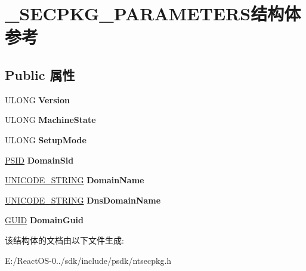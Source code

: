 \hypertarget{struct___s_e_c_p_k_g___p_a_r_a_m_e_t_e_r_s}{}\section{\+\_\+\+S\+E\+C\+P\+K\+G\+\_\+\+P\+A\+R\+A\+M\+E\+T\+E\+R\+S结构体 参考}
\label{struct___s_e_c_p_k_g___p_a_r_a_m_e_t_e_r_s}
\subsection*{Public 属性}
\begin{DoxyCompactItemize}
\item 
\mbox{\label{struct___s_e_c_p_k_g___p_a_r_a_m_e_t_e_r_s_a3725922c50c4a83540a82a3fb1a77fdd}} 
U\+L\+O\+NG {\bfseries Version}
\item 
\mbox{\label{struct___s_e_c_p_k_g___p_a_r_a_m_e_t_e_r_s_af290c1d3bbd445cbbc3fdabc88ea8e8d}} 
U\+L\+O\+NG {\bfseries Machine\+State}
\item 
\mbox{\label{struct___s_e_c_p_k_g___p_a_r_a_m_e_t_e_r_s_a6373e979362496698671b70def97b03e}} 
U\+L\+O\+NG {\bfseries Setup\+Mode}
\item 
\mbox{\label{struct___s_e_c_p_k_g___p_a_r_a_m_e_t_e_r_s_aefd0943249dc145f2f7fe12150eb024f}} 
\hyperlink{struct___s_i_d}{P\+S\+ID} {\bfseries Domain\+Sid}
\item 
\mbox{\label{struct___s_e_c_p_k_g___p_a_r_a_m_e_t_e_r_s_acf5c68787bb1ffeea4698a39dd4d249f}} 
\hyperlink{struct___u_n_i_c_o_d_e___s_t_r_i_n_g}{U\+N\+I\+C\+O\+D\+E\+\_\+\+S\+T\+R\+I\+NG} {\bfseries Domain\+Name}
\item 
\mbox{\label{struct___s_e_c_p_k_g___p_a_r_a_m_e_t_e_r_s_a92a741ec3e779c63be5a6dd6c1d5ea6b}} 
\hyperlink{struct___u_n_i_c_o_d_e___s_t_r_i_n_g}{U\+N\+I\+C\+O\+D\+E\+\_\+\+S\+T\+R\+I\+NG} {\bfseries Dns\+Domain\+Name}
\item 
\mbox{\label{struct___s_e_c_p_k_g___p_a_r_a_m_e_t_e_r_s_a11fb081be4827f4c4ddb7874122aa6b0}} 
\hyperlink{interface_g_u_i_d}{G\+U\+ID} {\bfseries Domain\+Guid}
\end{DoxyCompactItemize}


该结构体的文档由以下文件生成\+:\begin{DoxyCompactItemize}
\item 
E\+:/\+React\+O\+S-\/0../sdk/include/psdk/ntsecpkg.\+h\end{DoxyCompactItemize}
